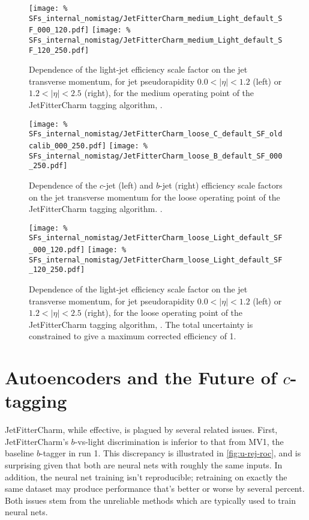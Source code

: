 \begin{figure}
  \centering
    \texttt{[image: \%
SFs\_internal\_nomistag/JetFitterCharm\_medium\_Light\_default\_SF\_000\_120.pdf]}
  \texttt{[image: \%
SFs\_internal\_nomistag/JetFitterCharm\_medium\_Light\_default\_SF\_120\_250.pdf]}
  \caption{Dependence of the light-jet efficiency scale factor on the jet transverse momentum, for jet pseudorapidity $0.0 < | \eta | < 1.2$ (left) or 
    $1.2 < | \eta | < 2.5$ (right), for the medium operating point of the  JetFitterCharm tagging algorithm, \lSF.}
  \label{JFC_SF_L1}
\end{figure}


\begin{figure}
  \centering
  \texttt{[image: \%
SFs\_internal\_nomistag/JetFitterCharm\_loose\_C\_default\_SF\_oldcalib\_000\_250.pdf]}
  \texttt{[image: \%
SFs\_internal\_nomistag/JetFitterCharm\_loose\_B\_default\_SF\_000\_250.pdf]}
  \caption{Dependence of the $c$-jet (left) and $b$-jet (right) efficiency scale factors on the jet transverse momentum for the loose operating point of the 
    JetFitterCharm tagging algorithm. \bcSF.}
  \label{JFC_SF_B_loose}
\end{figure}

\begin{figure}
  \centering
  \texttt{[image: \%
SFs\_internal\_nomistag/JetFitterCharm\_loose\_Light\_default\_SF\_000\_120.pdf]}
  \texttt{[image: \%
SFs\_internal\_nomistag/JetFitterCharm\_loose\_Light\_default\_SF\_120\_250.pdf]}
  \caption{Dependence of the light-jet efficiency scale factor on the jet transverse momentum, for jet pseudorapidity $0.0 < | \eta | < 1.2$ (left) or 
    $1.2 < | \eta | < 2.5$ (right), for the loose operating point of the JetFitterCharm tagging algorithm, \lSF. The total uncertainty is constrained to give a maximum corrected efficiency of 1.}
  \label{JFC_SF_L1_loose}
\end{figure}

\clearpage



\section{Autoencoders and the Future of $c$-tagging}
JetFitterCharm, while effective, is plagued by several related issues.
First, JetFitterCharm's $b$-vs-light discrimination is inferior to that from MV1, the baseline $b$-tagger in run 1. This discrepancy is illustrated in \cref{fig:u-rej-roc}, and is surprising given that both are neural nets with roughly the same inputs.
In addition, the neural net training isn't reproducible; retraining on exactly the same dataset may produce performance that's better or worse by several percent.
Both issues stem from the unreliable methods which are typically used to train neural nets.

